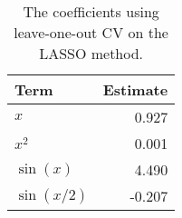 \begin{table}[t]

\caption{\label{tab:lasso-coefs}The coefficients using leave-one-out \ac{CV} on the \ac{LASSO} method.}
\centering
\begin{tabular}{lr}
\toprule
Term & Estimate\\
\midrule
\(x\) & 0.927\\
\(x^2\) & 0.001\\
\(\sin(x)\) & 4.490\\
\(\sin(x/2)\) & -0.207\\
\bottomrule
\end{tabular}
\end{table}